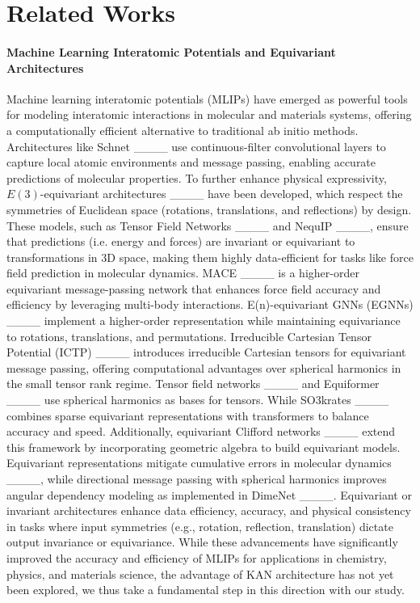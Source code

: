 \section{Related Works}
\paragraph{Machine Learning Interatomic Potentials and Equivariant Architectures} 
Machine learning interatomic potentials (MLIPs) 
have emerged as powerful tools for modeling interatomic interactions in molecular and materials systems, offering a computationally efficient alternative to traditional ab initio methods. Architectures like Schnet ____ use continuous-filter convolutional layers to capture local atomic environments and message passing, enabling accurate predictions of molecular properties. To further enhance physical expressivity, $E(3)$-equivariant architectures ____ have been developed, which respect the symmetries of Euclidean space (rotations, translations, and reflections) by design. These models, such as Tensor Field Networks ____ and NequIP ____, ensure that predictions (i.e. energy and forces) are invariant or equivariant to transformations in 3D space, making them highly data-efficient for tasks like force field prediction in molecular dynamics. 
MACE ____ is a higher-order equivariant message-passing network that enhances force field accuracy and efficiency by leveraging multi-body interactions. 
E(n)-equivariant GNNs (EGNNs) ____ implement a higher-order representation while maintaining equivariance to rotations, translations, and permutations. 
Irreducible Cartesian Tensor Potential (ICTP)  ____ introduces irreducible Cartesian tensors for equivariant message passing, offering computational advantages over spherical harmonics in the small tensor rank regime. Tensor field networks ____ and Equiformer ____ use spherical harmonics as bases for tensors. While SO3krates ____ combines sparse equivariant representations with transformers to balance accuracy and speed.
Additionally, equivariant Clifford networks ____
extend this framework by incorporating geometric algebra to build equivariant models. 
Equivariant representations mitigate cumulative errors in molecular dynamics  ____,  while 
directional message passing with spherical harmonics improves angular dependency modeling as implemented in DimeNet ____.  
Equivariant or invariant architectures enhance data efficiency, accuracy, and physical consistency in tasks where input symmetries (e.g., rotation, reflection, translation) dictate output invariance or equivariance.
While these advancements have significantly improved the accuracy and efficiency of MLIPs for applications in chemistry, physics, and materials science, the advantage of KAN architecture has not yet been explored, we thus take a fundamental step in this direction with our study. 

